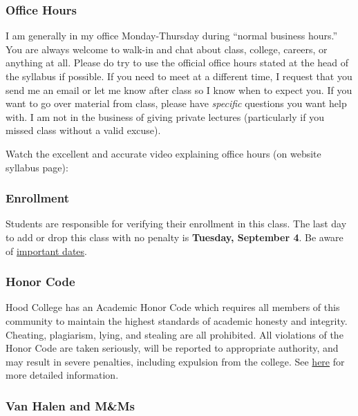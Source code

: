 \documentclass{article}
\begin{document}
\hypertarget{office-hours}{%
\subsubsection{Office Hours}\label{office-hours}}

I am generally in my office Monday-Thursday during ``normal business
hours.'' You are always welcome to walk-in and chat about class,
college, careers, or anything at all. Please do try to use the official
office hours stated at the head of the syllabus if possible. If you need
to meet at a different time, I request that you send me an email or let
me know after class so I know when to expect you. If you want to go over
material from class, please have \emph{specific} questions you want help
with. I am not in the business of giving private lectures (particularly
if you missed class without a valid excuse).

Watch the excellent and accurate video explaining office hours (on
website syllabus page):

\hypertarget{enrollment}{%
\subsubsection{Enrollment}\label{enrollment}}

Students are responsible for verifying their enrollment in this class.
The last day to add or drop this class with no penalty is
\textbf{Tuesday, September 4}. Be aware of
\href{https://www.hood.edu/offices-services/registrars-office/academic-calendar}{important
dates}.

\hypertarget{honor-code}{%
\subsubsection{Honor Code}\label{honor-code}}

Hood College has an Academic Honor Code which requires all members of
this community to maintain the highest standards of academic honesty and
integrity. Cheating, plagiarism, lying, and stealing are all prohibited.
All violations of the Honor Code are taken seriously, will be reported
to appropriate authority, and may result in severe penalties, including
expulsion from the college. See
\href{http://hood.smartcatalogiq.com/en/2016-2017/Catalog/The-Spirit-of-Hood/The-Academic-Honor-Code-and-Code-of-Conduct}{here}
for more detailed information.

\hypertarget{van-halen-and-mms}{%
\subsubsection{Van Halen and M\&Ms}\label{van-halen-and-mms}}
\end{document}

